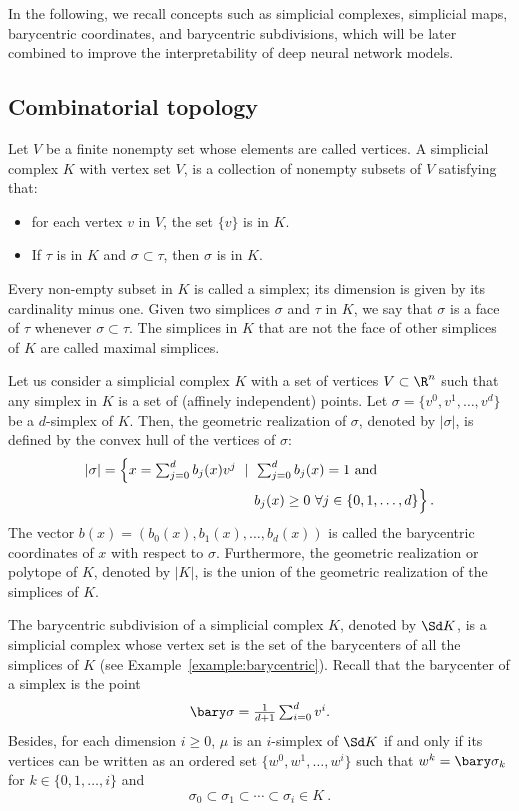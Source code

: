 In the following, we recall concepts such as simplicial complexes, simplicial maps, barycentric coordinates, and barycentric subdivisions, which will be later combined to improve the interpretability of deep neural network models.

\subsection{Combinatorial topology}

Let $V$ be a finite nonempty set whose elements are called vertices. A simplicial complex $K$ with vertex set $V$, is a collection  of nonempty subsets of $V$ satisfying that:
\begin{itemize}
    \item for each vertex $v$ in $V$, the set $\{v\}$ is in $K$.
    \item If $\tau$ is in $K$ and $\sigma\subset \tau$, then $\sigma$ is in $K$.
\end{itemize}
Every non-empty subset in $K$ is called a simplex; its dimension is given by its cardinality minus one. 
Given two simplices $\sigma$ and $\tau$ in $K$, we say that $\sigma$ is a face of $\tau$ whenever $\sigma\subset \tau$.
The simplices in $K$ that are not the face of other simplices of $K$  are called maximal simplices.

Let us consider a simplicial complex $K$ with a set of vertices $V\subset\R^n$ such that any simplex in $K$ is a set of (affinely independent) points. Let
$\sigma=\{v^0,v^1,\dots,v^d\}$ be a $d$-simplex of $K$. Then, the geometric realization of $\sigma$, denoted by $|\sigma|$, is defined by the convex hull of the vertices of $\sigma$:
\begin{equation*}
\begin{split}
|\sigma|=\Big\{\mbox{$x=\sum_{j=0}^d b_j(x) v^j$} \ \mid \   \mbox{$\sum_{j=0}^d b_j(x) =1 $ and \hspace{1.2cm}  }
\\ 
b_j(x)\ge 0 \ \forall j\in\{0,1,\dots,d\} 
\Big\}\,.    
\end{split}
\end{equation*}
The vector  $b(x)=(b_0(x),b_1(x),\dots,b_d(x))$
is called the barycentric coordinates of $x$ with respect to $\sigma$. 
Furthermore, the geometric realization or polytope of $K$,
denoted by $|K|$, is the union of the geometric realization of the simplices of $K$. 

The barycentric subdivision of a simplicial complex $K$,
denoted by $\Sd K$, is a simplicial complex whose vertex set is the set of the barycenters of all the simplices of $K$ (see Example~\ref{example:barycentric}).
Recall that the barycenter of a simplex
 is the 
point
$$\mbox{$\bary \sigma=\frac{1}{d+1}\sum_{i=0}^d v^i$}.$$
Besides, for each dimension $i\ge 0$, $\mu$ is an $i$-simplex of $\Sd K$ if and only if its vertices can be written as an ordered set $\{ w^0,w^1,\dots,w^i \}$ such that $w^k=\bary \sigma_k$ for $k\in\{0,1,\dots,i\}$ and  $$\sigma_0\subset \sigma_1\subset\cdots \subset\sigma_i
\in K \ .$$
 
